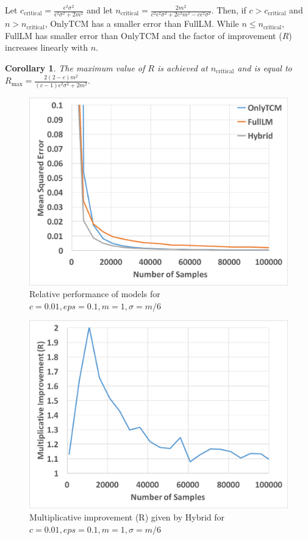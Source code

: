 \documentclass{article}
\theoremstyle{plain}
\newtheorem*{cor}{Corollary}
\begin{document}
Let $c_{\text{critical}} = \frac{\epsilon^2 \sigma^2}{\epsilon^2 \sigma^2+2 m^2}$ and let $n_{\text{critical}} = \frac{2 m^2}{c^2 \epsilon^2 \sigma^2+2 c^2 m^2-c \epsilon^2 \sigma^2}.$ Then, if $c>c_{\text{critical}}$ and $n > n_{\text{critical}}$, OnlyTCM has a smaller error than FullLM. While $n \leq n_{\text{critical}}$, FullLM has smaller error than OnlyTCM and the factor of improvement ($R$) increases linearly with $n$. 

\begin{cor}
The maximum value of $R$ is achieved at $n_{\text{critical}}$ and is equal to $R_{\text{max}} = \frac{2 (2-c) m^2}{(c-1) \epsilon^2 \sigma^2+2 m^2}.$
\end{cor}

\begin{figure}[t]
\begin{minipage}{.45\textwidth}
\includegraphics[width=0.9\linewidth]{eps01c01.pdf}
\caption{Relative performance of models for $c=0.01, eps=0.1, m=1, \sigma = m/6$}
\end{minipage}
\end{figure}

\begin{figure}[t]
\begin{minipage}{.45\textwidth}
\includegraphics[width=0.9\linewidth]{imp_eps01c01.pdf}
\caption{Multiplicative improvement (R) given by Hybrid for $c=0.01, eps=0.1, m=1, \sigma = m/6$}
\end{minipage}
\end{figure}
\end{document}
